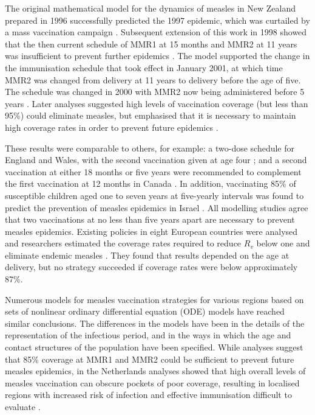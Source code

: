 \documentclass{article}
\begin{document}
The original mathematical model for the dynamics of measles in New Zealand prepared in 1996 \citep{tobias98} successfully predicted the 1997 epidemic, which was curtailed by a mass vaccination campaign \citep{mansoor98,roberts0}. Subsequent extension of this work in 1998 showed that the then current schedule of MMR1 at 15 months and MMR2 at 11 years was insufficient to prevent further epidemics \citep{roberts0}. The model supported the change in the immunisation schedule that took effect in January 2001, at which time MMR2 was changed from delivery at 11 years to delivery before the age of five. The schedule was changed in 2000 with MMR2 now being administered before 5 years \citep{anon2a}. Later analyses suggested high levels of vaccination coverage (but less than 95\%) could eliminate measles, but emphasised that it is necessary to maintain high coverage rates in order to prevent future epidemics \citep{roberts4}.

These results were comparable to others, for example: a two-dose schedule for England and Wales, with the second vaccination given at age four \citep{babad95}; and a second vaccination at either 18 months or five years were recommended to complement the first vaccination at 12 months in Canada \citep{gay98}. In addition, vaccinating 85\% of susceptible children aged one to seven years at five-yearly intervals was found to predict the prevention of measles epidemics in Israel \citep{agur93}. All modelling studies agree that two vaccinations at no less than five years apart are necessary to prevent measles epidemics. Existing policies in eight European countries were analysed and researchers estimated the coverage rates required to reduce $R_v$ below one and eliminate endemic measles \citep{wallinga1}. They found that results depended on the age at delivery, but no strategy succeeded if coverage rates were below approximately 87\%.

Numerous models for measles vaccination strategies for various regions \citep{agur93, babad95, edmunds0, gay98, wallinga1} based on sets of nonlinear ordinary differential equation (ODE) models have reached similar conclusions. The differences in the models have been in the details of the representation of the infectious period, and in the ways in which the age and contact structures of the population have been specified. While analyses suggest that 85\% coverage at MMR1 and MMR2 could be sufficient to prevent future measles epidemics, in the Netherlands analyses showed that high overall levels of measles vaccination can obscure pockets of poor coverage, resulting in localised regions with increased risk of infection and effective immunisation difficult to evaluate \citep{glass4}. 
\end{document}
